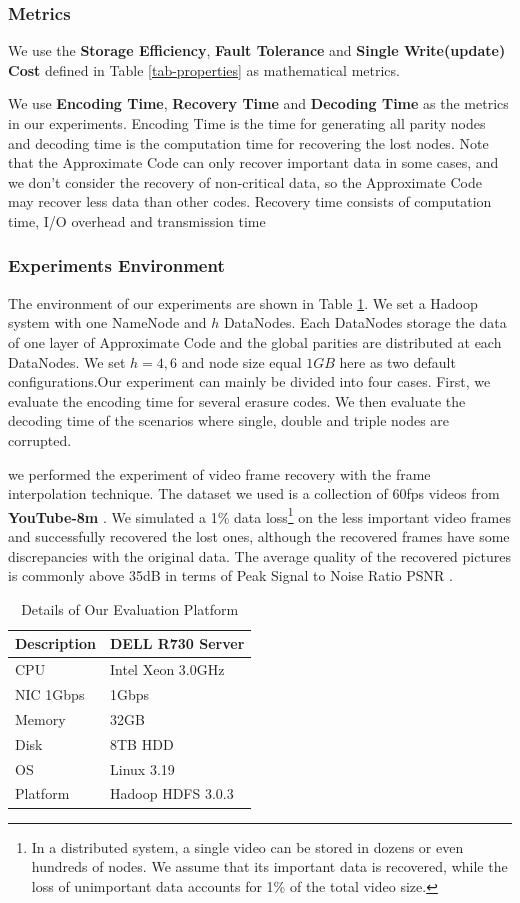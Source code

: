 \documentclass[sigconf]{acmart}
\begin{document}
\subsubsection{Metrics}
We use the \textbf{Storage Efficiency}, \textbf{Fault Tolerance} and \textbf{Single Write(update) Cost} defined in Table \ref{tab-properties} as mathematical metrics.

We use \textbf{Encoding Time}, \textbf{Recovery Time} and \textbf{Decoding Time} as the metrics in our experiments. Encoding Time is the time for generating all parity nodes and decoding time is the computation time for recovering the lost nodes. Note that the Approximate Code can only recover important data in some cases, and we don't consider the recovery of non-critical data, so the Approximate Code may recover less data than other codes. Recovery time consists of computation time, I/O overhead and transmission time
\subsubsection{Experiments Environment}
The environment of our experiments are shown in Table \ref{tab-platform}. We set a Hadoop system with one NameNode and $h$ DataNodes. Each DataNodes storage the data of one layer of Approximate Code and the global parities are distributed at each DataNodes. We set $h=4,6$ and node size equal $1GB$ here as two default configurations.Our experiment can mainly be divided into four cases. First, we evaluate the encoding time for several erasure codes. We then evaluate the decoding time of the scenarios where single, double and triple nodes are corrupted.

we performed the experiment of video frame recovery with the frame interpolation technique. The dataset we used is a collection of 60fps videos from \textbf{YouTube-8m} \cite{youtube8m}. We simulated a 1\% data loss\footnote{In a distributed system, a single video can be stored in dozens or even hundreds of nodes. We assume that its important data is recovered, while the loss of unimportant data accounts for 1\% of the total video size.} on the less important video frames and successfully recovered the lost ones, although the recovered frames have some discrepancies with the original data. The average quality of the recovered pictures is commonly above 35dB in terms of Peak Signal to Noise Ratio PSNR .

\begin{table}[!ht]
\begin{tabular}{|l|l|}
\hline
Description & DELL R730 Server \\ \hline
CPU & Intel Xeon 3.0GHz \\ \hline
NIC 1Gbps & 1Gbps \\ \hline
Memory & 32GB \\ \hline
Disk & 8TB HDD \\ \hline
OS & Linux 3.19 \\ \hline
Platform & Hadoop HDFS 3.0.3 \\ \hline
\end{tabular}
\caption{Details of Our Evaluation Platform}\label{tab-platform}
\end{table}
\end{document}
